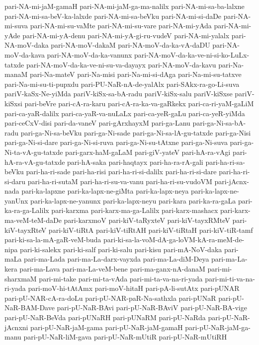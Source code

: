 {pari-NA-mi-jaM-gamaH
pari-NA-mi-jaM-ga-ma-nalilx
pari-NA-mi-sa-ba-lalxne
pari-NA-mi-sa-beV-ka-lalxde
pari-NA-mi-sa-beVku
pari-NA-mi-si-daDe
pari-NA-mi-suva
pari-NA-mi-su-vaMte
pari-NA-mi-su-vare
pari-NA-mi-yAda
pari-NA-mi-yAde
pari-NA-mi-yA-denu
pari-NA-mi-yA-gi-ru-vudeV
pari-NA-mi-yalalx
pari-NA-moV-daka
pari-NA-moV-dakaM
pari-NA-moV-da-ka-vA-daDU
pari-NA-moV-da-kava
pari-NA-moV-da-ka-vanunx
pari-NA-moV-da-ka-ve-ni-si-ko-LuLx-tatxde
pari-NA-moV-da-ka-ve-ni-su-va-dayayx
pari-NA-moV-da-kavu
pari-Na-manaM
pari-Na-mateV
pari-Na-misi
pari-Na-mi-si-dAga
pari-Na-mi-su-tatxve
pari-Na-mi-su-ti-pupxdu
pari-PU-NaR-nA-de-yalAlx
pari-SAkx-ra-go-Li-suva
pariV-kaSx-Ne-yiMda
pariV-kiSx-sa-bA-radu
pariV-kiSx-salu
pariV-kiSxse
pariV-kiSxsi
pari-beVre
pari-cA-ra-karu
pari-cA-ra-ka-va-gaRkekx
pari-ca-ri-yaM-gaLiM
pari-ca-yaR-dalilx
pari-ca-yaR-va-nuLaLx
pari-ca-yeR-gaLu
pari-ca-yeR-yiMda
pari-ceCxV-disi
pari-da-vaneV
pari-gArxhayxM
pari-ga-Lanu
pari-ga-Ni-sa-bA-radu
pari-ga-Ni-sa-beVku
pari-ga-Ni-sade
pari-ga-Ni-sa-lA-gu-tatxde
pari-ga-Nisi
pari-ga-Ni-si-dare
pari-ga-Ni-si-ruva
pari-ga-Ni-su-tAtxne
pari-ga-Ni-suva
pari-ga-Ni-ta-vA-gu-tatxde
pari-garx-haM-gaLaM
pari-giV-yateV
pari-hA-ra-vAgi
pari-hA-ra-vA-gu-tatxde
pari-hA-saka
pari-haqtayx
pari-ha-ra-rA-gali
pari-ha-ri-sa-beVku
pari-ha-ri-sade
pari-ha-risi
pari-ha-ri-si-dalilx
pari-ha-ri-si-dare
pari-ha-ri-si-daru
pari-ha-ri-sutaM
pari-ha-ri-su-va-vanu
pari-ha-ri-su-vudoVM
pari-jAcnx-nada
pari-ka-lapxne
pari-ka-lapx-ne-giMta
pari-ka-lapx-neya
pari-ka-lapx-ne-yanUnx
pari-ka-lapx-ne-yanunx
pari-ka-lapx-neyu
pari-kara
pari-ka-ra-gaLa
pari-ka-ra-ga-Lalilx
pari-karxma
pari-karx-ma-ga-Lalilx
pari-karx-mashacx
pari-karx-ma-veM-teM-daDe
pari-karxmoV
pari-kiV-taRyxteV
pari-kiV-tayxRMteV
pari-kiV-tayxRteV
pari-kiV-tiRtA
pari-kiV-tiRtAH
pari-kiV-tiRtaH
pari-kiV-tiR-tamf
pari-ki-sa-la-mA-gaR-veM-buda
pari-ki-sa-la-voM-dA-ga-loVM-kA-ra-meM-de-nipa
pari-ki-salekx
pari-ki-salf
pari-ki-salu
pari-kisu
pari-mA-NoV-daka
pari-maLa
pari-ma-Lada
pari-ma-La-darx-vayxda
pari-ma-La-diM-Deya
pari-ma-La-kera
pari-ma-Lava
pari-ma-La-veM-bene
pari-ma-ganx-nA-danaM
pari-mi-sharxmaM
pari-mi-take
pari-mi-ta-vAda
pari-mi-ta-va-na-ri-yada
pari-mi-ti-va-na-ri-yada
pari-moV-hi-tAtAmx
pari-moV-hitaH
pari-pA-li-sutAtx
pari-pUNAR
pari-pU-NAR-cA-ra-doLu
pari-pU-NAR-paR-Na-sathxla
pari-pUNaR
pari-pU-NaR-BAM-Dave
pari-pU-NaR-BAvi
pari-pU-NaR-BAviV
pari-pU-NaR-BA-vige
pari-pU-NaR-BeVda
pari-pUNaRH
pari-pUNaRM
pari-pU-NaRda
pari-pU-NaR-jAcnxni
pari-pU-NaR-jaM-gama
pari-pU-NaR-jaM-gamaH
pari-pU-NaR-jaM-ga-manu
pari-pU-NaR-liM-gava
pari-pU-NaR-mUtiR
pari-pU-NaR-mUtiRH
}
